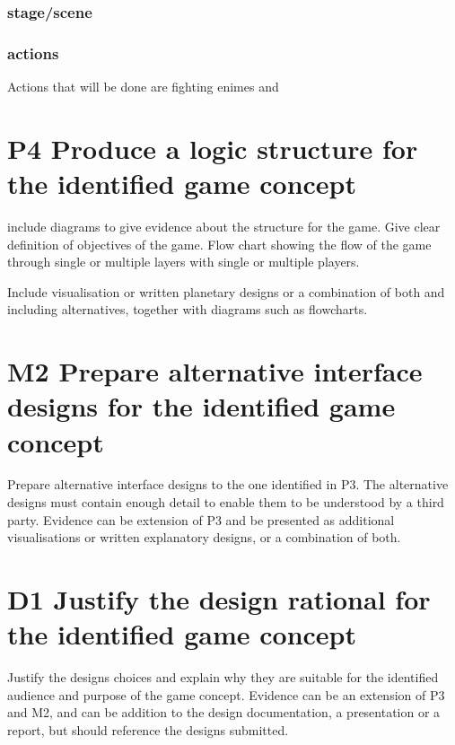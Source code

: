 \documentclass{article}
\begin{document}
\subsubsection{stage/scene}


\subsubsection{actions}
Actions that will be done are fighting enimes and 


\section{P4 Produce a logic structure for the identified game concept}
include diagrams to give evidence about the structure for the game. Give clear definition of objectives of the game. Flow chart showing the flow of the game through single or multiple layers with single or multiple players.

Include visualisation or written planetary designs or a combination of both and including alternatives, together with diagrams such as flowcharts.






\section{M2 Prepare alternative interface designs for the identified game concept}
Prepare alternative interface designs to the one identified in P3. The alternative designs must contain enough detail to enable them to be understood by a third party. Evidence can be extension of P3 and be presented as additional visualisations or written explanatory designs, or a combination of both.




\section{D1 Justify the design rational for the identified game concept}


Justify the designs choices and explain why they are suitable for the identified audience and purpose of the game concept. Evidence can be an extension of P3 and M2, and can be addition to the design documentation, a presentation or a report, but should reference the designs submitted.
\end{document}

